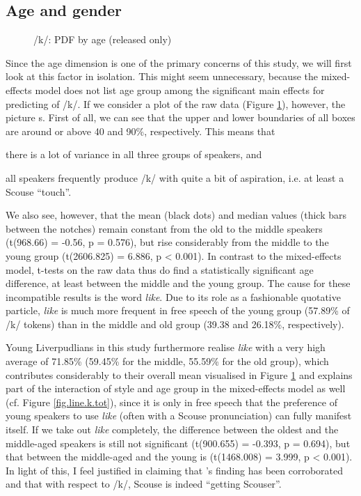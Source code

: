 \subsection{Age and gender}
\label{sec.prod.res.con.k.agegender}

\begin{figure}[h]
	\centering
		\resizebox{0.5\linewidth}{!}{} 
	\caption{/k/: PDF by age (released only)}
	\label{fig.box.k.tot}
\end{figure}

Since the age dimension is one of the primary concerns of this study, we will first look at this factor in isolation.
This might seem unnecessary, because the mixed-effects model does not list age group among the significant main effects for predicting  of /k/.
If we consider a plot of the raw data (Figure \ref{fig.box.k.tot}), however, the picture s.
First of all, we can see that the upper and lower boundaries of all boxes are around or above 40 and 90\%, respectively.
This means that
\begin{inparaenum}[(a)]
	\item there is a lot of variance in all three groups of speakers, and
	\item all speakers frequently produce /k/ with quite a bit of aspiration, i.e. at least a Scouse ``touch''.
\end{inparaenum}
We also see, however, that the mean (black dots) and median values (thick bars between the notches) remain constant from the old to the middle speakers (t(968.66) = -0.56, p = 0.576), but rise considerably from the middle to the young group (t(2606.825) = 6.886, p < 0.001).
In contrast to the mixed-effects model, t-tests on the raw data thus do find a statistically significant age difference, at least between the middle and the young group.
The cause for these incompatible results is the word \emph{like}.
Due to its role as a fashionable quotative particle, \emph{like} is much more frequent in free speech of the young group (57.89\% of /k/ tokens) than in the middle and old group (39.38 and 26.18\%, respectively).

Young Liverpudlians in this study furthermore realise \emph{like} with a very high average  of 71.85\% (59.45\% for the middle, 55.59\% for the old group), which contributes considerably to their overall mean visualised in Figure \ref{fig.box.k.tot} and explains part of the interaction of style and age group in the mixed-effects model as well (cf. Figure \ref{fig.line.k.tot}), since it is only in free speech that the preference of young speakers to use \emph{like} (often with a Scouse pronunciation) can fully manifest itself.
If we take out \emph{like} completely, the difference between the oldest and the middle-aged speakers is still not significant (t(900.655) = -0.393, p = 0.694), but that between the middle-aged and the young is (t(1468.008) = 3.999, p < 0.001).
In light of this, I feel justified in claiming that \citeauthor{watson2007a}'s \citeyearpar{watson2007a} finding has been corroborated and that with respect to /k/, Scouse is indeed ``getting Scouser''.

